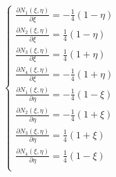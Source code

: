\documentclass[a4paper]{jpconf}
\begin{document}
\begin{equation}
\begin{cases}
\frac{\partial N_{1}\left(\xi,\eta\right)}{\partial \xi} =-\frac{1}{4}\left(1-\eta\right)\\
\frac{\partial N_{2}\left(\xi,\eta\right)}{\partial \xi} = \frac{1}{4}\left(1-\eta\right)\\
\frac{\partial N_{3}\left(\xi,\eta\right)}{\partial \xi} = \frac{1}{4}\left(1+\eta\right)\\
\frac{\partial N_{4}\left(\xi,\eta\right)}{\partial \xi} =-\frac{1}{4}\left(1+\eta\right)\\
\frac{\partial N_{1}\left(\xi,\eta\right)}{\partial \eta}=-\frac{1}{4}\left(1-\xi\right)\\
\frac{\partial N_{2}\left(\xi,\eta\right)}{\partial \eta}=-\frac{1}{4}\left(1+\xi\right)\\
\frac{\partial N_{3}\left(\xi,\eta\right)}{\partial \eta}= \frac{1}{4}\left(1+\xi\right)\\
\frac{\partial N_{4}\left(\xi,\eta\right)}{\partial \eta}= \frac{1}{4}\left(1-\xi\right)\\
\end{cases}
\end{equation}
\end{document}
